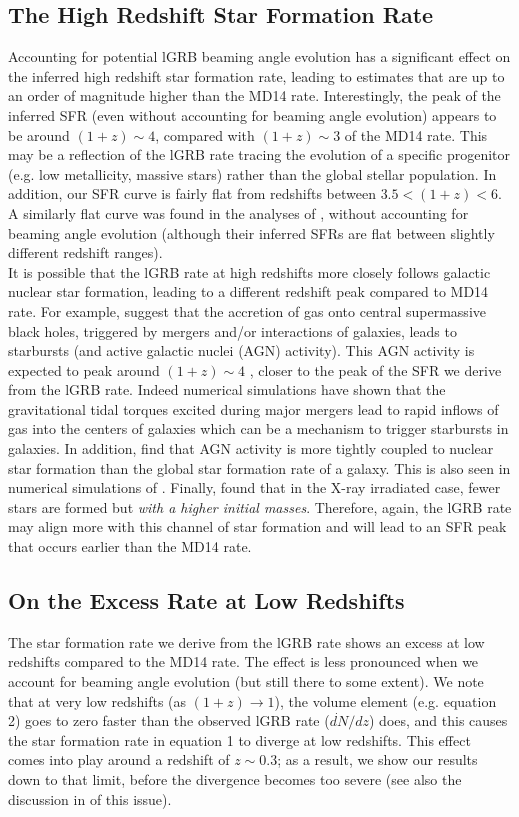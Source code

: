 \documentclass[fleqn,usenatbib,useAMS]{mnras}
\begin{document}
 
\subsection{The High Redshift Star Formation Rate} 
 Accounting for potential lGRB beaming angle evolution has a significant effect on the inferred high redshift star formation rate, leading to estimates that are up to an order of magnitude higher than the MD14 rate.   Interestingly, the peak of the inferred SFR (even without accounting for beaming angle evolution) appears to be around $(1+z) \sim 4$, compared with $(1+z) \sim 3$ of the MD14 rate. This may be a reflection of the lGRB rate tracing the evolution of a specific progenitor (e.g. low metallicity, massive stars) rather than the global stellar population.  In addition, our SFR curve is fairly flat from redshifts between $3.5 < (1+z) < 6$.  A similarly flat curve was found in the analyses of \cite{Kist08, PKK15, LR19}, without accounting for beaming angle evolution (although their inferred SFRs are flat between slightly different redshift ranges).\\
 
It is possible that the lGRB rate at high redshifts more closely follows galactic nuclear star formation, leading to a different redshift peak compared to MD14 rate. For example, \cite{HB06} suggest that the accretion of gas onto central supermassive black holes, triggered by mergers and/or interactions of galaxies, leads to starbursts (and active galactic nuclei (AGN) activity).  This AGN activity is expected to peak around $(1+z) \sim 4$ \citep{Miy15}, closer to the peak of the SFR we derive from the lGRB rate. Indeed numerical simulations have shown that the gravitational tidal torques excited during major mergers lead to rapid inflows of gas into the centers of galaxies \citep{BH96} which can be a mechanism to trigger starbursts in galaxies.  In addition, \cite{HQ10} find that AGN activity is more tightly coupled to nuclear star formation than the global star formation rate of a galaxy. This is also seen in numerical simulations of \cite{Ayk14, Ayk19}. Finally, \cite{HS10} found that in the X-ray irradiated case, fewer stars are formed but {\em with a higher initial masses}. Therefore, again, the lGRB rate may align more with this channel of star formation and will lead to an SFR peak that occurs earlier than the MD14 rate.
  

\subsection{On the Excess Rate at Low Redshifts}
The star formation rate we derive from the lGRB rate shows an excess at low redshifts compared to the MD14 rate.  The effect is less pronounced when we account for beaming angle evolution (but still there to some extent).  
We note that at very low redshifts (as $(1+z) \rightarrow 1$), the volume element (e.g. equation 2) goes to zero faster than the observed lGRB rate ($\dot{dN}/dz$) does,  and this causes the star formation rate in equation 1 to diverge at low redshifts. This effect comes into play around a redshift of $z \sim 0.3$; as a result, we show our results down to that limit, before the divergence becomes too severe (see also the discussion in \cite{LR19} of this issue). 
\end{document}
